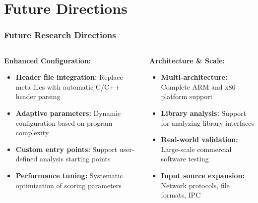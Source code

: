 \documentclass[aspectratio=169]{beamer}
\begin{document}
\section{Future Directions}

\begin{frame}
    \frametitle{Future Research Directions}
    \begin{columns}
        \begin{column}{0.5\textwidth}
            \textbf{Enhanced Configuration:}
            \begin{itemize}
                \item \textbf{Header file integration:} Replace meta files with automatic C/C++ header parsing
                \item \textbf{Adaptive parameters:} Dynamic configuration based on program complexity
                \item \textbf{Custom entry points:} Support user-defined analysis starting points
                \item \textbf{Performance tuning:} Systematic optimization of scoring parameters
            \end{itemize}
        \end{column}
        \begin{column}{0.5\textwidth}
            \textbf{Architecture \& Scale:}
            \begin{itemize}
                \item \textbf{Multi-architecture:} Complete ARM and x86 platform support
                \item \textbf{Library analysis:} Support for analyzing library interfaces
                \item \textbf{Real-world validation:} Large-scale commercial software testing
                \item \textbf{Input source expansion:} Network protocols, file formats, IPC
            \end{itemize}
        \end{column}
    \end{columns}
\end{frame}
\end{document}
